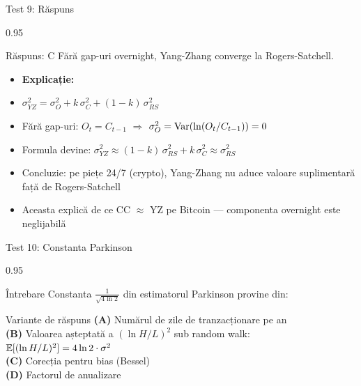\documentclass[9pt, aspectratio=169, t]{beamer}
\begin{document}
\begin{frame}[shrink=10]{Test 9: Răspuns}
\begin{cminipage}{0.95\textwidth}
    \begin{exampleblock}{Răspuns: C}
        Fără gap-uri overnight, Yang-Zhang converge la Rogers-Satchell.
    \end{exampleblock}
    \vspace{0.2cm}
    \begin{itemize}\setlength{\itemsep}{0pt}
        \item \textbf{Explicație:}
        \item $\sigma_{YZ}^2 = \sigma_O^2 + k\,\sigma_C^2 + (1-k)\,\sigma_{RS}^2$
        \item Fără gap-uri: $O_t = C_{t-1}$ $\Rightarrow$ $\sigma_O^2 = \text{Var}(\ln(O_t/C_{t-1})) = 0$
        \item Formula devine: $\sigma_{YZ}^2 \approx (1-k)\,\sigma_{RS}^2 + k\,\sigma_C^2 \approx \sigma_{RS}^2$
        \item Concluzie: pe piețe 24/7 (crypto), Yang-Zhang nu aduce valoare suplimentară față de Rogers-Satchell
        \item Aceasta explică de ce CC $\approx$ YZ pe Bitcoin --- componenta overnight este neglijabilă
    \end{itemize}
\end{cminipage}
\end{frame}

\begin{frame}[shrink=10]{Test 10: Constanta Parkinson}
\begin{cminipage}{0.95\textwidth}
    \begin{alertblock}{Întrebare}
        Constanta $\frac{1}{\sqrt{4\ln 2}}$ din estimatorul Parkinson provine din:
    \end{alertblock}

    \vspace{0.5cm}
    \begin{block}{Variante de răspuns}
    \textcolor{MainBlue}{\textbf{(A)}} Numărul de zile de tranzacționare pe an\\[3pt]
    \textcolor{MainBlue}{\textbf{(B)}} Valoarea așteptată a $(\ln H/L)^2$ sub random walk: $\mathbb{E}[(\ln H/L)^2] = 4\ln 2 \cdot \sigma^2$\\[3pt]
    \textcolor{MainBlue}{\textbf{(C)}} Corecția pentru bias (Bessel)\\[3pt]
    \textcolor{MainBlue}{\textbf{(D)}} Factorul de anualizare
    \end{block}
\end{cminipage}
\end{frame}
\end{document}
